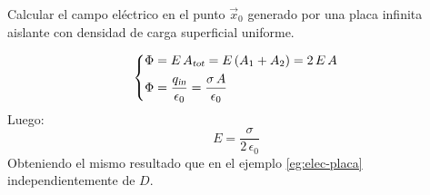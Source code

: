 \begin{mdframed}[style=ExampleFrame]
    \begin{example}
        \label{eg:gauss-placa}
    \end{example}
    \begin{formatI}
        Calcular el campo eléctrico en el punto $\vec{x}_0$ generado por una placa infinita aislante con densidad de carga superficial uniforme.
    \end{formatI}
    \begin{center}
        \def\svgwidth{\linewidth}
        
    \end{center}
    \begin{equation*}
        \left\{
        \begin{aligned}
            \Phi &= E \, {{A}_\textsl{{tot}}} = E \left(A_1+A_2\right) = 2 \, E \, A
            \\
            \Phi &= \frac{{{q}_\textsl{{in}}}}{\epsilon_0} = \frac{\sigma \, A}{\epsilon_0}
        \end{aligned}
        \right.
    \end{equation*}
    Luego:
    \begin{equation*}
        E = \frac{\sigma}{2 \, \epsilon_0}
    \end{equation*}
    Obteniendo el mismo resultado que en el ejemplo \ref{eg:elec-placa} independientemente de $D$.
\end{mdframed}

